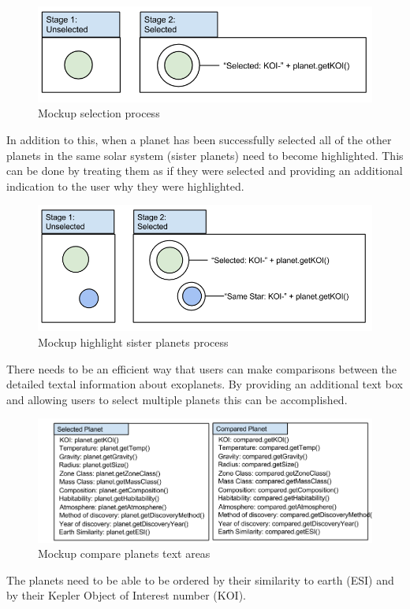 \begin{enumerate}
\begin{figure}[H]
  \centering
      \includegraphics[width=.8\textwidth]{images/mockSelected.png}
  \caption{Mockup selection process}  
\end{figure}

In addition to this, when a planet has been successfully selected all of the
other planets in the
same solar system (sister planets) need to become highlighted. This can be done
by treating them as if they were selected and providing an additional indication
 to the user why they were highlighted.  
\begin{figure}[H]
  \centering
      \includegraphics[width=.8\textwidth]{images/selectedSisterPlanets.png}
  \caption{Mockup highlight sister planets process}  
\end{figure}

There needs to be an efficient way that users can make comparisons between the
detailed textal information about exoplanets. By providing an additional text
box and allowing users to select multiple planets this can be accomplished.

\begin{figure}[H]
  \centering
      \includegraphics[width=.7\textwidth]{images/mockComparePlanets.png}
  \caption{Mockup compare planets text areas}  
\end{figure}
\clearpage

{\bf
 \item[R3.] The planets need to be able to be ordered by their similarity to
earth (ESI) and by their Kepler Object of Interest number (KOI).}


\end{enumerate}

